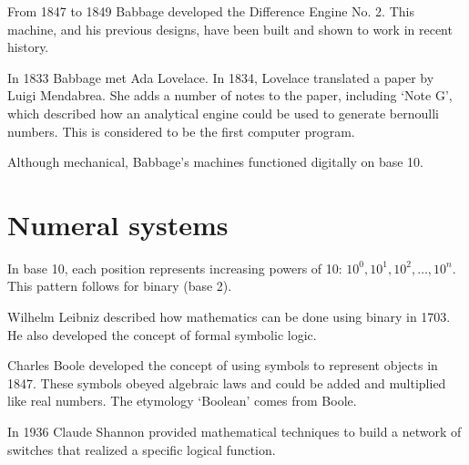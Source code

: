 From 1847 to 1849 Babbage developed the Difference Engine No. 2. This machine, and his previous designs, have been built and shown to work in recent history.

In 1833 Babbage met Ada Lovelace. In 1834, Lovelace translated a paper by Luigi Mendabrea. She adds a number of notes to the paper, including `Note G', which described how an analytical engine could be used to generate bernoulli numbers. This is considered to be the first computer program.

Although mechanical, Babbage's machines functioned digitally on base 10.

\section{Numeral systems}
In base 10, each position represents increasing powers of 10: \(10^0, 10^1, 10^2, \dots, 10^n\). This pattern follows for binary (base 2).

Wilhelm Leibniz described how mathematics can be done using binary in 1703. He also developed the concept of formal symbolic logic.

Charles Boole developed the concept of using symbols to represent objects in 1847. These symbols obeyed algebraic laws and could be added and multiplied like real numbers. The etymology `Boolean' comes from Boole.

In 1936 Claude Shannon provided mathematical techniques to build a network of switches that realized a specific logical function.
